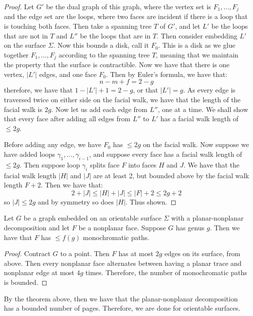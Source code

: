 \begin{proof}
	Let $G'$ be the dual graph of this graph, where the vertex set is $F_1, ..., F_j$ and the edge set are the loops, where two faces are incident if there is a loop that is touching both faces. Then take a spanning tree $T$ of $G'$, and let $L'$ be the loops that are not in $T$ and $L''$ be the loops that are in $T$. 
	Then consider embedding $L'$ on the surface $\Sigma$. Now this bounds a disk, call it $F_0$. This is a disk as we glue together $F_1, ..., F_j$ according to the spanning tree $T$, meaning that we maintain the property that the surface is contractible.
	Now we have that there is one vertex, $|L'|$ edges, and one face $F_0$. Then by Euler's formula, we have that:
	\begin{equation}
		n - m + f = 2 - g
	\end{equation}
	therefore, we have that $1 - |L'| + 1 = 2 - g$, or that $|L'| = g$. As every edge is traversed twice on either side on the facial walk, we have that the length of the facial walk is $2g$. 
	Now let us add each edge from $L''$, one at a time. We shall show that every face after adding all edges from $L''$ to $L'$ has a facial walk length of $\leq 2g$. 
	
	Before adding any edge, we have $F_0$ has $\leq 2g$ on the facial walk. Now suppose we have added loops $\gamma_1, ..., \gamma_{i - 1}$, and suppose every face has a facial walk length of $\leq 2g$. 
	Then suppose loop $\gamma_i$ splits face $F$ into faces $H$ and $J$. We have that the facial walk length $|H|$ and $|J|$ are at least 2, but bounded above by the facial walk length $F + 2$. Then we have that: 
	\begin{equation}
		2 + |J| \leq |H| + |J| \leq |F| + 2 \leq 2g + 2
	\end{equation}
	so $|J| \leq 2g$ and by symmetry so does $|H|$. Thus shown.
\end{proof}

\begin{corollary}
	Let $G$ be a graph embedded on an orientable surface $\Sigma$ with a planar-nonplanar decomposition and let $F$ be a nonplanar face. Suppose $G$ has genus $g$. Then we have that $F$ has $\leq f(g)$ monochromatic paths.
\end{corollary}

\begin{proof}
	Contract $G$ to a point. Then $F$ has at most $2g$ edges on its surface, from above. 
	Then every nonplanar face alternates between having a planar trace and nonplanar edge at most $4g$ times. Therefore, the number of monochromatic paths is bounded.
\end{proof}

By the theorem above, then we have that the planar-nonplanar decomposition has a bounded number of pages. Therefore, we are done for orientable surfaces. 